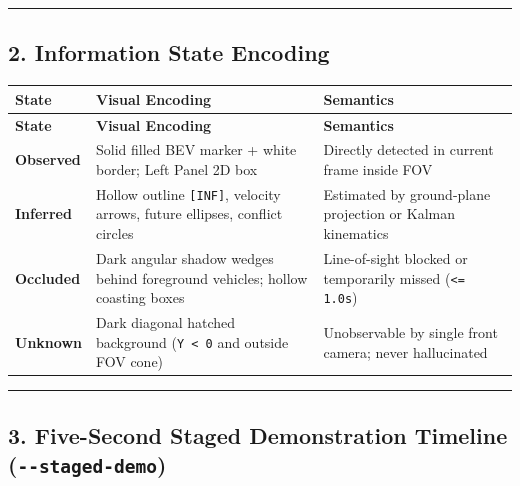 \documentclass[10.5pt,a4paper]{article}
\begin{document}
\par\noindent\rule{\textwidth}{0.4pt}\par\medskip

\subsection{2. Information State Encoding}


\begin{footnotesize}
\setlength{\tabcolsep}{4pt}
\setlength{\LTleft}{0pt}\setlength{\LTright}{0pt}
\begin{longtable}{>{\raggedright\arraybackslash}p{} >{\raggedright\arraybackslash}p{} >{\raggedright\arraybackslash}p{}}
\toprule
\textbf{State} & \textbf{Visual Encoding} & \textbf{Semantics} \\
\midrule
\endfirsthead
\toprule
\textbf{State} & \textbf{Visual Encoding} & \textbf{Semantics} \\
\midrule
\endhead
\bottomrule
\endfoot
\textbf{Observed} & Solid filled BEV marker + white border; Left Panel 2D box & Directly detected in current frame inside FOV \\
\textbf{Inferred} & Hollow outline \texttt{[INF]}, velocity arrows, future ellipses, conflict circles & Estimated by ground-plane projection or Kalman kinematics \\
\textbf{Occluded} & Dark angular shadow wedges behind foreground vehicles; hollow coasting boxes & Line-of-sight blocked or temporarily missed (\texttt{<= 1.\allowbreak{}0s}) \\
\textbf{Unknown} & Dark diagonal hatched background (\texttt{Y < 0} and outside FOV cone) & Unobservable by single front camera; never hallucinated \\
\end{longtable}
\end{footnotesize}


\par\noindent\rule{\textwidth}{0.4pt}\par\medskip

\subsection{3. Five-Second Staged Demonstration Timeline (\texttt{-\allowbreak{}-\allowbreak{}staged-\allowbreak{}demo})}
\end{document}
